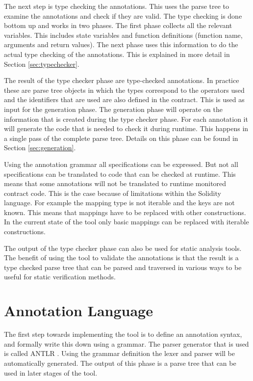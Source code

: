 \documentclass[a4paper]{article}
\begin{document}
The next step is type checking the annotations. This uses the parse tree to examine the annotations and check if they are valid. The type checking is done bottom up and works in two phases. The first phase collects all the relevant variables. This includes state variables and function definitions (function name, arguments and return values). The next phase uses this information to do the actual type checking of the annotations. This is explained in more detail in Section \ref{sec:typechecker}. \par
The result of the type checker phase are type-checked annotations. In practice these are parse tree objects in which the types correspond to the operators used and the identifiers that are used are also defined in the contract. This is used as input for the generation phase. The generation phase will operate on the information that is created during the type checker phase. For each annotation it will generate the code that is needed to check it during runtime. This happens in a single pass of the complete parse tree. Details on this phase can be found in Section \ref{sec:generation}. \par
Using the annotation grammar all specifications can be expressed. But not all specifications can be translated to code that can be checked at runtime. This means that some annotations will not be translated to runtime monitored contract code. This is the case because of limitations within the Solidity language. For example the mapping type is not iterable and the keys are not known. This means that mappings have to be replaced with other constructions. In the current state of the tool only basic mappings can be replaced with iterable constructions. \par
The output of the type checker phase can also be used for static analysis tools. The benefit of using the tool to validate the annotations is that the result is a type checked parse tree that can be parsed and traversed in various ways to be useful for static verification methods. 

\section{Annotation Language}
\label{sec:annotationlanguage}
The first step towards implementing the tool is to define an annotation syntax, and formally write this down using a grammar. The parser generator that is used is called ANTLR \cite{parr2013definitive}. Using the grammar definition the lexer and parser will be automatically generated. The output of this phase is a parse tree that can be used in later stages of the tool.
\end{document}
